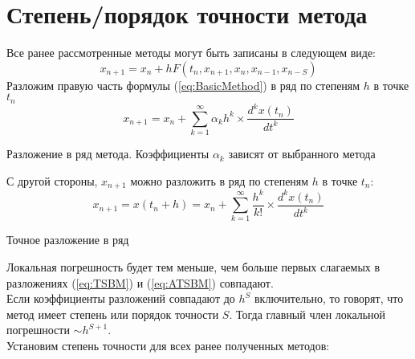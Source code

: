 \documentclass[a4paper,11pt]{article}
\begin{document}
\section{Степень/порядок точности метода\protect\footnotemark}
Все ранее рассмотренные методы могут быть записаны в следующем виде:
\begin{equation}
  x_{n+1} = x_n + hF(t_n, x_{n+1}, x_n, x_{n-1}, x_{n-S})
  \label{eq:BasicMethod}
\end{equation}
Разложим правую часть формулы (\ref{eq:BasicMethod}) в ряд по степеням $h$ в точке $t_n$
\begin{equation}
  x_{n+1} = x_n + \sum_{k=1}^{\infty} \alpha_kh^k \times \frac{d^kx(t_n)}{dt^k}
  \label{eq:TSBM}
\end{equation}
\begin{center}
  \small{Разложение в ряд метода. Коэффициенты $\alpha_k$ зависят от выбранного метода}
\end{center}
С другой стороны, $x_{n+1}$ можно разложить в ряд по степеням $h$ в точке $t_n$:
\begin{equation}
  x_{n+1} = x(t_n + h) = x_n + \sum_{k=1}^{\infty} \frac{h^k}{k!} \times \frac{d^kx(t_n)}{dt^k}
  \label{eq:ATSBM}
\end{equation}
\begin{center}
  \small{Точное разложение в ряд}
\end{center}
Локальная погрешность будет тем меньше, чем больше первых слагаемых в разложениях (\ref{eq:TSBM}) и (\ref{eq:ATSBM}) совпадают. \\
Если коэффициенты разложений совпадают до $h^S$ включительно, то говорят, что метод имеет степень или порядок точности $S$.
  Тогда главный член локальной погрешности $\sim h^{S+1}$. \\
Установим степень точности для всех ранее полученных методов:
\end{document}
